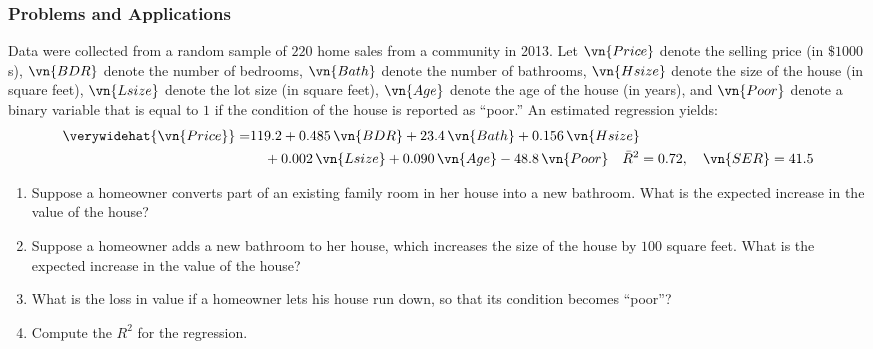 

\begin{frame}[shrink=5]
\frametitle{Problems and Applications}
Data were collected from a random sample of $220$ home sales from a community in 2013. Let $\vn{Price}$ denote the selling price (in $\$1000$s), $\vn{BDR}$ denote the number of bedrooms, $\vn{Bath}$ denote the number of bathrooms, $\vn{Hsize}$ denote the size of the house (in square feet), $\vn{Lsize}$ denote the lot size (in square feet), $\vn{Age}$ denote the age of the house (in years), and $\vn{Poor}$ denote a binary variable that is equal to $1$ if the condition of the house is reported as ``poor.'' An estimated regression yields:
\begin{align*}
\verywidehat{\vn{Price}} 
  = & 119.2 + 0.485\,\vn{BDR} + 23.4\,\vn{Bath} + 0.156\,\vn{Hsize} \\
    & \quad + 0.002\,\vn{Lsize} + 0.090\,\vn{Age} - 48.8\,\vn{Poor}
  \quad \bar{R}^2 = 0.72,
  \quad \vn{SER} = 41.5
\end{align*}
\vspace*{-4ex}
\begin{enumerate}
\item Suppose a homeowner converts part of an existing family room in her house into a new bathroom. What is the expected increase in the value of the house?
\item Suppose a homeowner adds a new bathroom to her house, which increases the size of the house by $100$ square feet. What is the expected increase in the value of the house?
\item What is the loss in value if a homeowner lets his house run down, so that its condition becomes ``poor''?
\item Compute the $R^{2}$ for the regression.
\end{enumerate}
\end{frame}

